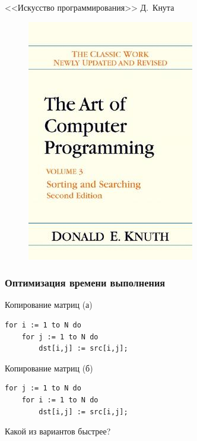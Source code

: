 \documentclass{beamer}
\begin{document}
\begin{frame}{<<Искусство программирования>> Д.~Кнута}
\begin{figure}
\begin{minipage}[h]{0.33\linewidth}
            \end{minipage}
            \begin{minipage}[h]{0.33\linewidth}
                \includegraphics[width=0.8\linewidth]{fig/TAoP3.jpg}
            \end{minipage}
        \end{figure}    
    \end{frame}
    \begin{frame}[fragile]
        \frametitle{Оптимизация времени выполнения}
        \begin{block}{Копирование матриц (а)}
        \begin{verbatim}
for i := 1 to N do
    for j := 1 to N do
        dst[i,j] := src[i,j];
        \end{verbatim}   
        \end{block}
        \begin{block}{Копирование матриц (б)}
        \begin{verbatim}
for j := 1 to N do
    for i := 1 to N do
        dst[i,j] := src[i,j];
        \end{verbatim}   
        \end{block}
        Какой из вариантов быстрее? \\
        \pause
        \color{red}{Вариант (б) работает быстрее в 6 раз}
\end{frame}
\end{document}
